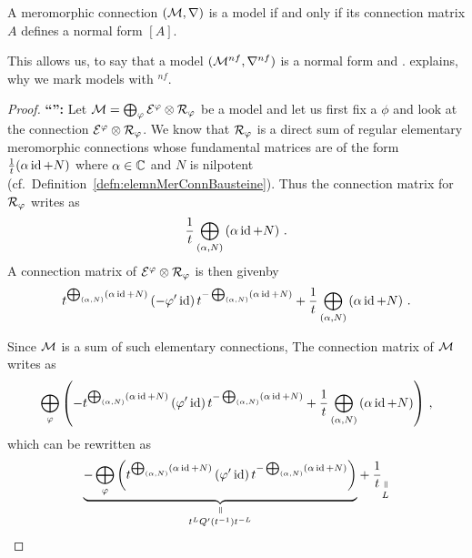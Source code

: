 \begin{thm}\label{thm:modelEqNormalForm}
  A meromorphic connection $(\mathcal{M},\nabla)$ is a model if and only if its
  connection matrix $A$ defines a normal form $[A]$.
  \begin{s-rem}
    This allows us, to say that a model $(\mathcal{M}^{nf},\nabla^{nf})$ is a normal
    form and .
     explains, why we mark models with ${}^{nf}$.
  \end{s-rem}
\end{thm}
\begin{proof}
  \textbf{``\Rightarrow{}'':}
  Let $\mathcal{M}=\bigoplus_{\varphi}\mathcal{E}^\varphi\otimes\mathcal{R}_\varphi$ be a model and let us first
  fix a $\phi$ and look at the connection $\mathcal{E}^\varphi\otimes\mathcal{R}_\varphi$.
  We know that $\mathcal{R}_\varphi$ is a direct sum of regular elementary meromorphic
  connections whose fundamental matrices are of the form
  $\frac{1}{t}(\alpha\operatorname{id}+N)$ where $\alpha\in\mathbb{C}$ and $N$ is nilpotent
  (cf.\ Definition~\ref{defn:elemnMerConnBausteine}).
  Thus the connection matrix for $\mathcal{R}_\varphi$ writes as
  \[
    \frac{1}{t} \bigoplus_{(\alpha,N)}\left( \alpha\operatorname{id}+N\right)
    \,.
  \]
  A connection matrix of $\mathcal{E}^\varphi\otimes\mathcal{R}_\varphi$ is then given\PROBLEM[!] by
  \[
    t^{\bigoplus_{(\alpha,N)}\left( \alpha\operatorname{id}+N\right)}
    \left(-\varphi'\operatorname{id}\right)
    t^{-\bigoplus_{(\alpha,N)}\left( \alpha\operatorname{id}+N\right)}
    + \frac{1}{t} \bigoplus_{(\alpha,N)}\left( \alpha\operatorname{id}+N\right) \,.
  \]
  \begin{comment}
    \textbf{OR}
    A connection matrix of $\cE^\phi\otimes\cR_\phi$ is then given by
    \[
      -\phi'\id + \frac{1}{t} \bigoplus_{(\alpha,N)}\left( \alpha\id+N\right)
      \,.
    \]
  \end{comment}
  Since $\mathcal{M}$ is a sum of such elementary connections, The connection matrix of
  $\mathcal{M}$ writes as
  \[
    \bigoplus_\varphi\left(
      - t^{\bigoplus_{(\alpha,N)}\left( \alpha\operatorname{id}+N\right)}
      \left(\varphi'\operatorname{id}\right)
      t^{-\bigoplus_{(\alpha,N)}\left( \alpha\operatorname{id}+N\right)}
      +
      \frac{1}{t} \bigoplus_{(\alpha,N)}\left( \alpha\operatorname{id}+N\right)
    \right) \,,
  \]
  which can be rewritten as
  \[
    \underset{t^LQ'(t^{-1})t^{-L}}{
      \underset{\text{\rotatebox[origin=c]{-90}{$=$}}}{%
        \underbrace{-\bigoplus_\phi
          \left(
            t^{\bigoplus_{(\alpha,N)}\left( \alpha\id+N\right)}
            \left(\phi'\id\right)
            t^{-\bigoplus_{(\alpha,N)}\left( \alpha\id+N\right)}
          \right)
        }
      }
    }
    +
    \frac{1}{t}
    \underset{L}{
      \underset{\text{\rotatebox[origin=c]{-90}{$=$}}}{%
}}\]
\end{proof}
